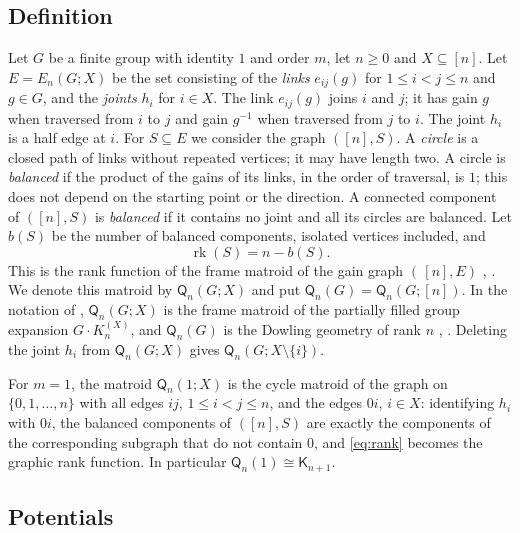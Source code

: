 \documentclass[11pt]{amsart}
\theoremstyle{definition}
\theoremstyle{remark}
\numberwithin{equation}{section}
\newcommand{\Q}{\mathsf{Q}}
\newcommand{\K}{\mathsf{K}}
\newcommand{\rk}{\operatorname{rk}}
\begin{document}
\subsection{Definition}
Let $G$ be a finite group with identity $1$ and order $m$, let $n\ge0$ and $X\subseteq[n]$. Let $E=E_n(G;X)$ be the set consisting of the \emph{links} $e_{ij}(g)$ for $1\le i<j\le n$ and $g\in G$, and the \emph{joints} $h_i$ for $i\in X$. The link $e_{ij}(g)$ joins $i$ and $j$; it has gain $g$ when traversed from $i$ to $j$ and gain $g^{-1}$ when traversed from $j$ to $i$. The joint $h_i$ is a half edge at $i$. For $S\subseteq E$ we consider the graph $([n],S)$. A \emph{circle} is a closed path of links without repeated vertices; it may have length two. A circle is \emph{balanced} if the product of the gains of its links, in the order of traversal, is $1$; this does not depend on the starting point or the direction. A connected component of $([n],S)$ is \emph{balanced} if it contains no joint and all its circles are balanced. Let $b(S)$ be the number of balanced components, isolated vertices included, and
\begin{equation}\label{eq:rank}
\rk(S)=n-b(S).
\end{equation}
This is the rank function of the frame matroid of the gain graph $(\,[n],E)$ \cite[Section~2]{Zas91}, \cite[Section~1]{Zas22}. We denote this matroid by $\Q_n(G;X)$ and put $\Q_n(G)=\Q_n(G;[n])$. In the notation of \cite{Zas22}, $\Q_n(G;X)$ is the frame matroid of the partially filled group expansion $G\cdot K_n^{(X)}$, and $\Q_n(G)$ is the Dowling geometry of rank $n$ \cite{Dow73}, \cite[Section~1]{Zas22}. Deleting the joint $h_i$ from $\Q_n(G;X)$ gives $\Q_n(G;X\setminus\{i\})$.

For $m=1$, the matroid $\Q_n(1;X)$ is the cycle matroid of the graph on $\{0,1,\dots,n\}$ with all edges $ij$, $1\le i<j\le n$, and the edges $0i$, $i\in X$: identifying $h_i$ with $0i$, the balanced components of $([n],S)$ are exactly the components of the corresponding subgraph that do not contain $0$, and \eqref{eq:rank} becomes the graphic rank function. In particular $\Q_n(1)\cong\K_{n+1}$.

\subsection{Potentials}
\end{document}
